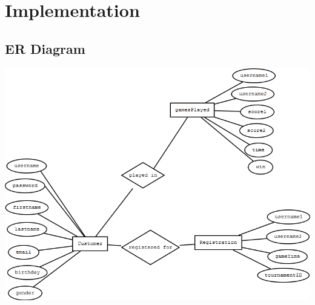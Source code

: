 %

\section{Implementation}
	
	
	
	
	\subsection{ER Diagram}
		\includegraphics[width=1.0\textwidth]{./ER_Database_Diagram.png}
	
	

\newpage